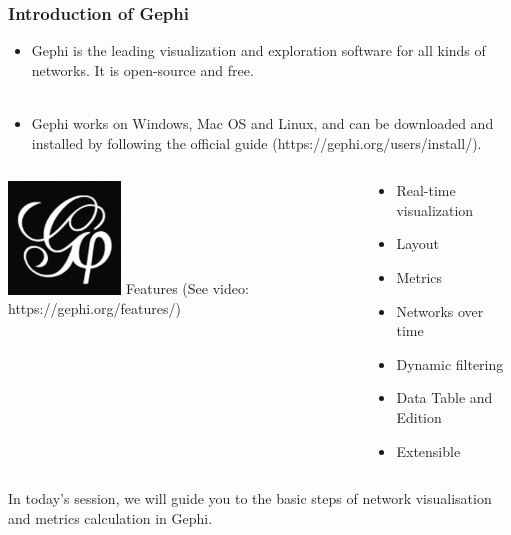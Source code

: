 \documentclass[10pt]{beamer}
\begin{document}
\begin{frame}
\frametitle{Introduction of Gephi}
\begin{itemize}
\item Gephi is the leading visualization and exploration software for all kinds of networks. It is open-source and free. \\~\\
\item Gephi works on Windows, Mac OS and Linux, and can be downloaded and installed by following the official guide (https://gephi.org/users/install/).
\end{itemize}
\begin{columns}
\centering
\includegraphics[height=3cm, width=3cm]{figures/gephi.jpg}
Features (See video: https://gephi.org/features/)
\begin{multicols}{3}
\begin{itemize}
\item Real-time visualization
\item Layout
\item Metrics
\item Networks over time
\item Dynamic filtering
\item Data Table and Edition
\item Extensible
\end{itemize}
\end{multicols}
\end{columns} 
\end{frame}

\begin{frame}
In today's session, we will guide you to the basic steps of network \alert{visualisation} and \alert{metrics calculation} in Gephi.
\end{frame}

\end{document}
